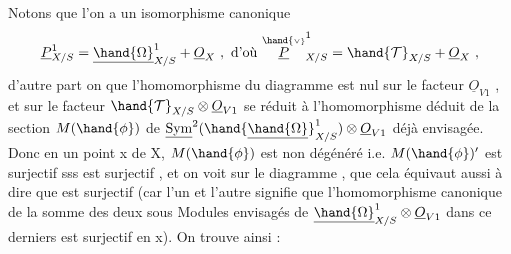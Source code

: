 Notons que l'on a un isomorphisme canonique
\[ \underline{P}^1_{X/S} = \underline{\hand{\Omega}}^1_{X/S} + \underline{O}_X \ ,\ \text{d'où}\ \overset{\hand{\scriptscriptstyle\vee}}{\underline{P}}^1_{X/S} = \hand{\mathcal{T}}_{X/S} + \underline{O}_X \ , \]
d'autre part on  que l'homomorphisme  \hand{$\mu$} du diagramme  est nul
sur le facteur $\underline{O}_{V1}$ , et sur le facteur $\hand{\mathcal{T}}_{X/S}\otimes\underline{O}_{V1}$  se réduit à
l'homomorphisme  déduit de la section $M(\hand{\phi})$ de $\underline{\mathrm{Sym}}^2(\hand{\underline{\hand{\Omega}}}^1_{X/S})\otimes \underline{O}_{V1}$ déjà
envisagée. Donc en un point x de X, $M(\hand{\phi})$ est non dégénéré i.e. $M(\hand{\phi})'$
est surjectif sss \hand{$\mu$} est surjectif , et on voit sur le diagramme ,
que cela équivaut aussi à dire que \hand{$\nu$} est surjectif  (car l'un et l'autre
signifie que l'homomorphisme canonique de la somme des deux sous
Modules envisagés de $\underline{\hand{\Omega}}^1_{X/S}\otimes \underline{O}_{V1}$ dans ce derniers est surjectif en
x). On trouve ainsi :

